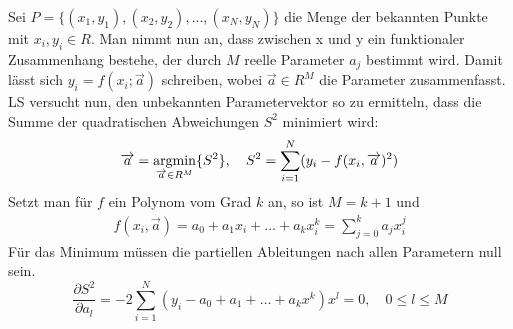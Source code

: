 Sei $P = \{(x_1, y_1), (x_2, y_2), ..., (x_N, y_N)\}$ die Menge der bekannten Punkte mit $x_i, y_i \in R$. Man nimmt nun an, dass zwischen x und y ein funktionaler Zusammenhang bestehe, der durch $M$ reelle Parameter $a_j$ bestimmt wird. Damit lässt sich $y_i = f(x_i; \overrightarrow{a})$ schreiben, wobei $\overrightarrow{a} \in R^M$ die Parameter zusammenfasst. LS versucht nun, den unbekannten Parametervektor so zu ermitteln, dass die Summe der quadratischen Abweichungen $S^2$ minimiert wird:
\begin{equation}
\begin{split}
\overrightarrow{a} = \mathop{\mathrm{argmin}}_{\overrightarrow{a} \in R^M} \{ S^2 \}, \quad
S^2 =  \sum_{i=1}^{N} (y_i - f(x_i, \overrightarrow{a})^2)
\end{split}
\label{eq:opt}
\end{equation}
Setzt man für $f$ ein Polynom vom Grad $k$ an, so ist $M = k+1$ und
\begin{gather}
f(x_i, \overrightarrow{a}) = a_0 + a_1 x_i + \dots + a_k x_i^k = \sum_{j = 0}^{k} a_j x_i^j %
\end{gather}
Für das Minimum müssen die partiellen Ableitungen nach allen Parametern null sein.
\begin{equation}
\frac{\partial S^2}{\partial a_l} = -2 \sum_{i=1}^{N}(y_i - a_0 + a_1 + \dots + a_k x^k) x^l = 0, \quad 0 \leq l \leq M
\end{equation}
